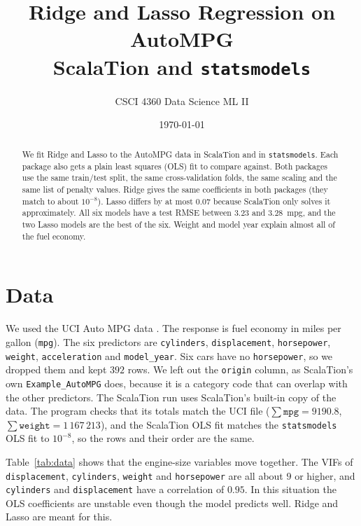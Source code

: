 \documentclass[11pt]{article}
\title{Ridge and Lasso Regression on AutoMPG\\[2pt]
\large ScalaTion and \texttt{statsmodels}}
\author{CSCI 4360 Data Science ML II}
\date{\today}
\begin{document}
\maketitle

\begin{abstract}
\noindent We fit Ridge and Lasso to the AutoMPG data in ScalaTion and in \texttt{statsmodels}. Each package also gets a
plain least squares (OLS) fit to compare against. Both packages use the same train/test split, the same
cross-validation folds, the same scaling and the same list of penalty values. Ridge gives the same coefficients in both
packages (they match to about $10^{-8}$). Lasso differs by at most $0.07$ because ScalaTion only solves it approximately.
All six models have a test RMSE between $3.23$ and $3.28$~mpg, and the two Lasso models are the best of the six. Weight and
model year explain almost all of the fuel economy.
\end{abstract}

\section{Data}

We used the UCI Auto MPG data \cite{quinlan1993}. The response is fuel economy in miles per gallon (\texttt{mpg}). The six
predictors are \texttt{cylinders}, \texttt{displacement}, \texttt{horsepower}, \texttt{weight}, \texttt{acceleration} and
\texttt{model\_year}. Six cars have no \texttt{horsepower}, so we dropped them and kept $392$ rows. We left out the
\texttt{origin} column, as ScalaTion's own \texttt{Example\_AutoMPG} does, because it is a category code that can overlap
with the other predictors. The ScalaTion run uses ScalaTion's built-in copy of the data. The program checks that its totals match the UCI file
($\sum\texttt{mpg}=9190.8$, $\sum\texttt{weight}=1\,167\,213$), and the ScalaTion OLS fit matches the \texttt{statsmodels} OLS
fit to $10^{-8}$, so the rows and their order are the same.

\begin{table}[htbp]
\centering\small

\caption{The 392 cars. VIF (variance inflation factor) is computed on the 314 training rows.}\label{tab:data}
\end{table}

Table~\ref{tab:data} shows that the engine-size variables move together. The VIFs of \texttt{displacement},
\texttt{cylinders}, \texttt{weight} and \texttt{horsepower} are all about $9$ or higher, and \texttt{cylinders} and
\texttt{displacement} have a correlation of $0.95$. In this situation the OLS coefficients are unstable even though the model
predicts well. Ridge and Lasso are meant for this.
\end{document}
